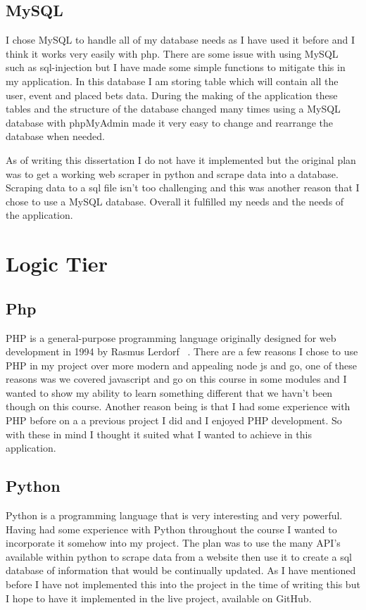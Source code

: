\subsection{MySQL}
I chose MySQL to handle all of my database needs as I have used it before and I think it works very easily with php. There are some issue with using MySQL such as sql-injection but I have made some simple functions to mitigate this in my application. In this database I am storing table which will contain all the user, event and placed bets data. During the making of the application these tables and the structure of the database changed many times using a MySQL database with phpMyAdmin made it very easy to change and rearrange the database when needed.

As of writing this dissertation I do not have it implemented but the original plan was to get a working web scraper in python and scrape data into a database. Scraping data to a sql file isn't too challenging and this was another reason that I chose to use a MySQL database. Overall it fulfilled my needs and the needs of the application. 

\section{Logic Tier}
\subsection{Php}
PHP is a general-purpose programming language originally designed for web development in 1994 by Rasmus Lerdorf~\cite{php} . There are a few reasons I chose to use PHP in my project over more modern and appealing node js and go, one of these reasons was we covered javascript and go on this course in some modules and I wanted to show my ability to learn something different that we havn't been though on this course. Another reason being is that I had some experience with PHP before on a a previous project I did and I enjoyed PHP development. So with these in mind I thought it suited what I wanted to achieve in this application.

\subsection{Python}
Python is a programming language that is very interesting and very powerful. Having had some experience with Python throughout the course I wanted to incorporate it somehow into my project. The plan was to use the many API's available within python to scrape data from a website then use it to create a sql database of information that would be continually updated. As I have mentioned before I have not implemented this into the project in the time of writing this but I hope to have it implemented in the live project, available on GitHub.


